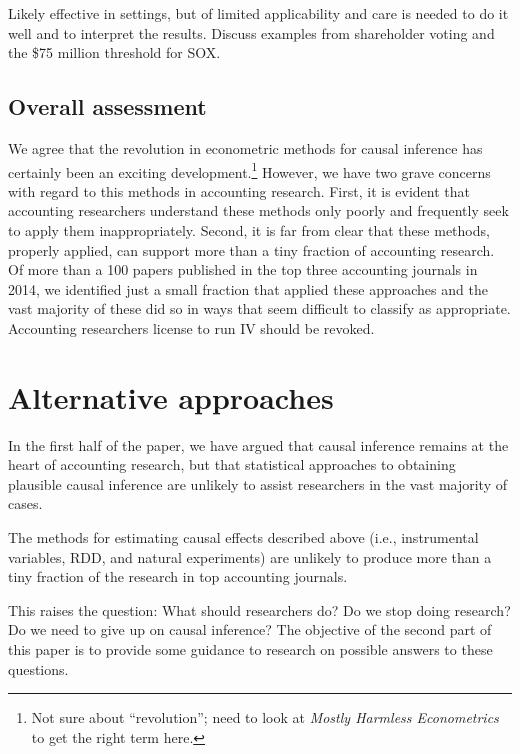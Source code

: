\newpage

Likely effective in settings, but of limited applicability and care is needed to do it well and to interpret the results. Discuss examples from shareholder voting and the \$75 million threshold for SOX.

\subsection{Overall assessment}

We agree that the revolution in econometric methods for causal inference has certainly been an exciting development.\footnote{Not sure about ``revolution''; need to look at \emph{Mostly Harmless Econometrics} to get the right term here.} However, we have two grave concerns with regard to this methods in accounting research. First, it is evident that accounting researchers understand these methods only poorly and frequently seek to apply them inappropriately. Second,  it is far from clear that these methods, properly applied, can support more than a tiny fraction of accounting research. Of more than a 100 papers published in the top three accounting journals in 2014, we identified just a small fraction that applied these approaches and the vast majority of these did so in ways that seem difficult to classify as appropriate. Accounting researchers license to run IV should be revoked.

\section{Alternative approaches}

In the first half of the paper, we have argued that causal inference remains at the heart of accounting research, but that statistical approaches to obtaining plausible causal inference are unlikely to assist researchers in the vast majority of cases.

The methods for estimating causal effects described above (i.e., instrumental variables, RDD, and natural experiments) are unlikely to produce more than a tiny fraction of the research in top accounting journals.

This raises the question: What should researchers do? Do we stop doing research? Do we need to give up on causal inference? The objective of the second part of this paper is to provide some guidance to research on possible answers to these questions.


